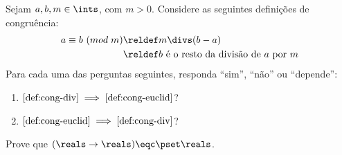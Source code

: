 \begin{exercise}
    Sejam $a,b,m \in \ints$, com $m>0$.
    Considere as seguintes definições de congruência:
    \begin{align}
        \label{def:cong-div} a \equiv b\ (\mathrel{mod} m) & \reldef m \divs (b-a) \\
        & \label{def:cong-euclid} \reldef \text{$b$ é o resto da divisão de $a$ por $m$}
    \end{align}
    Para cada uma das perguntas seguintes, responda ``sim'', ``não'' ou ``depende'':
    \begin{enumerate}
        \item $\ref{def:cong-div} \implies \ref{def:cong-euclid}$?
        \item $\ref{def:cong-euclid} \implies \ref{def:cong-div}$?
    \end{enumerate}
\end{exercise}

\begin{exercise}
    Prove que $(\reals \to \reals) \eqc \pset \reals$.
\end{exercise}